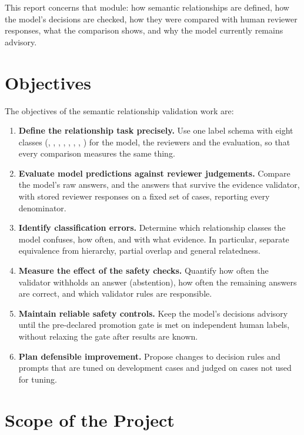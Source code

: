 This report concerns that module: how semantic relationships are defined, how the model's decisions are checked, how they were compared with human reviewer responses, what the comparison shows, and why the model currently remains advisory.

\section{Objectives}
\label{sec:objectives}

The objectives of the semantic relationship validation work are:

\begin{enumerate}
    \item \textbf{Define the relationship task precisely.} Use one label schema with eight classes (\SC, \PA, \CH, \RE, \PO, \UN, \AM, \IE) for the model, the reviewers and the evaluation, so that every comparison measures the same thing.
    \item \textbf{Evaluate model predictions against reviewer judgements.} Compare the model's raw answers, and the answers that survive the evidence validator, with stored reviewer responses on a fixed set of cases, reporting every denominator.
    \item \textbf{Identify classification errors.} Determine which relationship classes the model confuses, how often, and with what evidence. In particular, separate equivalence from hierarchy, partial overlap and general relatedness.
    \item \textbf{Measure the effect of the safety checks.} Quantify how often the validator withholds an answer (abstention), how often the remaining answers are correct, and which validator rules are responsible.
    \item \textbf{Maintain reliable safety controls.} Keep the model's decisions advisory until the pre-declared promotion gate is met on independent human labels, without relaxing the gate after results are known.
    \item \textbf{Plan defensible improvement.} Propose changes to decision rules and prompts that are tuned on development cases and judged on cases not used for tuning.
\end{enumerate}

\section{Scope of the Project}
\label{sec:scope}

